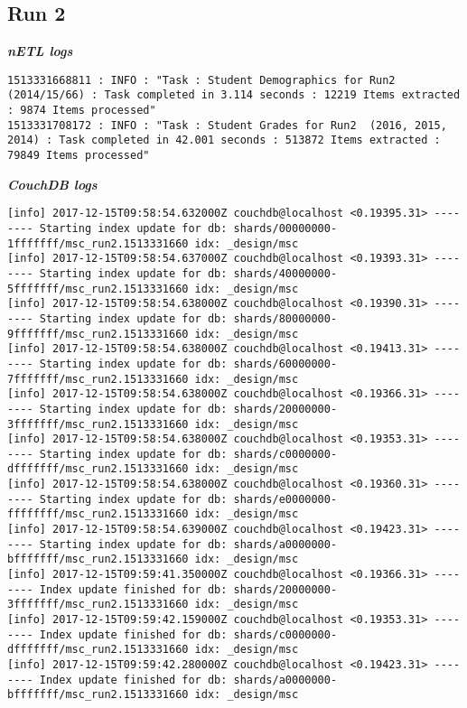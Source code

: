 \subsection{Run 2}
\textit{\textbf{nETL logs}}
\begin{verbatim}
1513331668811 : INFO : "Task : Student Demographics for Run2 (2014/15/66) : Task completed in 3.114 seconds : 12219 Items extracted : 9874 Items processed"
1513331708172 : INFO : "Task : Student Grades for Run2  (2016, 2015, 2014) : Task completed in 42.001 seconds : 513872 Items extracted : 79849 Items processed"
\end{verbatim}

\textit{\textbf{CouchDB logs}}
\begin{verbatim}
[info] 2017-12-15T09:58:54.632000Z couchdb@localhost <0.19395.31> -------- Starting index update for db: shards/00000000-1fffffff/msc_run2.1513331660 idx: _design/msc
[info] 2017-12-15T09:58:54.637000Z couchdb@localhost <0.19393.31> -------- Starting index update for db: shards/40000000-5fffffff/msc_run2.1513331660 idx: _design/msc
[info] 2017-12-15T09:58:54.638000Z couchdb@localhost <0.19390.31> -------- Starting index update for db: shards/80000000-9fffffff/msc_run2.1513331660 idx: _design/msc
[info] 2017-12-15T09:58:54.638000Z couchdb@localhost <0.19413.31> -------- Starting index update for db: shards/60000000-7fffffff/msc_run2.1513331660 idx: _design/msc
[info] 2017-12-15T09:58:54.638000Z couchdb@localhost <0.19366.31> -------- Starting index update for db: shards/20000000-3fffffff/msc_run2.1513331660 idx: _design/msc
[info] 2017-12-15T09:58:54.638000Z couchdb@localhost <0.19353.31> -------- Starting index update for db: shards/c0000000-dfffffff/msc_run2.1513331660 idx: _design/msc
[info] 2017-12-15T09:58:54.638000Z couchdb@localhost <0.19360.31> -------- Starting index update for db: shards/e0000000-ffffffff/msc_run2.1513331660 idx: _design/msc
[info] 2017-12-15T09:58:54.639000Z couchdb@localhost <0.19423.31> -------- Starting index update for db: shards/a0000000-bfffffff/msc_run2.1513331660 idx: _design/msc
[info] 2017-12-15T09:59:41.350000Z couchdb@localhost <0.19366.31> -------- Index update finished for db: shards/20000000-3fffffff/msc_run2.1513331660 idx: _design/msc
[info] 2017-12-15T09:59:42.159000Z couchdb@localhost <0.19353.31> -------- Index update finished for db: shards/c0000000-dfffffff/msc_run2.1513331660 idx: _design/msc
[info] 2017-12-15T09:59:42.280000Z couchdb@localhost <0.19423.31> -------- Index update finished for db: shards/a0000000-bfffffff/msc_run2.1513331660 idx: _design/msc

\end{verbatim}

